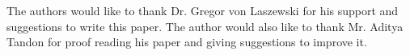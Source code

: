 \documentclass[sigconf]{acmart}
\begin{document}
\begin{acks}

The authors would like to thank Dr. Gregor von Laszewski for his
support and suggestions to write this paper.  The author would also
like to thank Mr. Aditya Tandon for proof reading his paper and giving
suggestions to improve it.

\end{acks}


 
\end{document}
